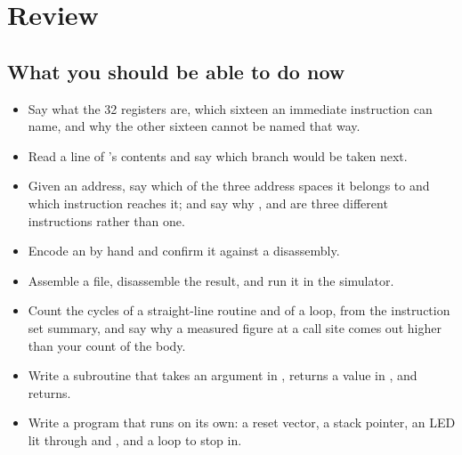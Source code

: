 
\section{Review}
\label{c1:sec:review}

\subsection*{What you should be able to do now}
\begin{itemize}
  \item Say what the 32 registers are, which sixteen an immediate instruction can name, and why
    the other sixteen cannot be named that way.
  \item Read a line of 's contents and say which branch would be taken next.
  \item Given an address, say which of the three address spaces it belongs to and which
    instruction reaches it; and say why ,  and  are three different
    instructions rather than one.
  \item Encode an  by hand and confirm it against a disassembly.
  \item Assemble a  file, disassemble the result, and run it in the simulator.
  \item Count the cycles of a straight-line routine and of a loop, from the instruction set
    summary, and say why a measured figure at a call site comes out higher than your count of the
    body.
  \item Write a subroutine that takes an argument in , returns a value in ,
    and returns.
  \item Write a program that runs on its own: a reset vector, a stack pointer, an LED lit through
     and , and a loop to stop in.
\end{itemize}

